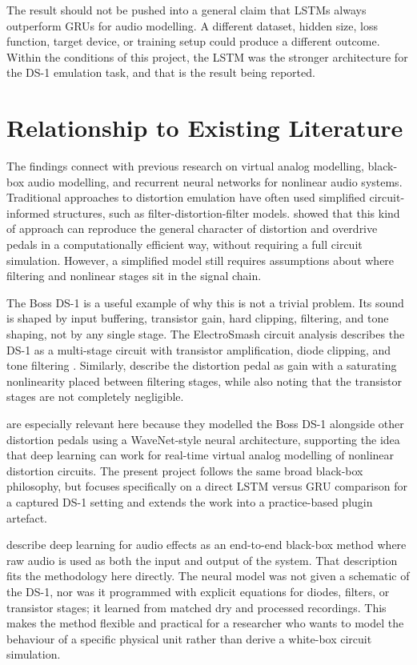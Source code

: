 The result should not be pushed into a general claim that LSTMs always outperform GRUs for audio modelling. A different dataset, hidden size, loss function, target device, or training setup could produce a different outcome. Within the conditions of this project, the LSTM was the stronger architecture for the DS-1 emulation task, and that is the result being reported.

\section{Relationship to Existing Literature}

The findings connect with previous research on virtual analog modelling, black-box audio modelling, and recurrent neural networks for nonlinear audio systems. Traditional approaches to distortion emulation have often used simplified circuit-informed structures, such as filter-distortion-filter models. \citet{yeh_simplified_2007} showed that this kind of approach can reproduce the general character of distortion and overdrive pedals in a computationally efficient way, without requiring a full circuit simulation. However, a simplified model still requires assumptions about where filtering and nonlinear stages sit in the signal chain.

The Boss DS-1 is a useful example of why this is not a trivial problem. Its sound is shaped by input buffering, transistor gain, hard clipping, filtering, and tone shaping, not by any single stage. The ElectroSmash circuit analysis describes the DS-1 as a multi-stage circuit with transistor amplification, diode clipping, and tone filtering \citep{noauthor_electrosmash_nodate}. Similarly, \citet{yeh_simplified_2007} describe the distortion pedal as gain with a saturating nonlinearity placed between filtering stages, while also noting that the transistor stages are not completely negligible.

\citet{wright_real-time_2019} are especially relevant here because they modelled the Boss DS-1 alongside other distortion pedals using a WaveNet-style neural architecture, supporting the idea that deep learning can work for real-time virtual analog modelling of nonlinear distortion circuits. The present project follows the same broad black-box philosophy, but focuses specifically on a direct LSTM versus GRU comparison for a captured DS-1 setting and extends the work into a practice-based plugin artefact.

\citet{martinez_ramirez_deep_2020} describe deep learning for audio effects as an end-to-end black-box method where raw audio is used as both the input and output of the system. That description fits the methodology here directly. The neural model was not given a schematic of the DS-1, nor was it programmed with explicit equations for diodes, filters, or transistor stages; it learned from matched dry and processed recordings. This makes the method flexible and practical for a researcher who wants to model the behaviour of a specific physical unit rather than derive a white-box circuit simulation.

